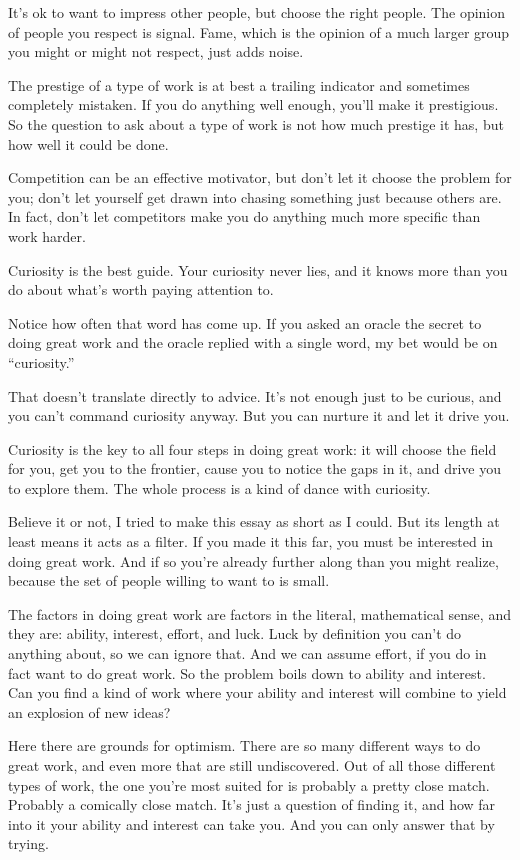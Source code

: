 It's ok to want to impress other people, but choose the right people.
The opinion of people you respect is signal. Fame, which is the opinion
of a much larger group you might or might not respect, just adds noise.

The prestige of a type of work is at best a trailing indicator and
sometimes completely mistaken. If you do anything well enough, you'll
make it prestigious. So the question to ask about a type of work is not
how much prestige it has, but how well it could be done.

Competition can be an effective motivator, but don't let it choose the
problem for you; don't let yourself get drawn into chasing something
just because others are. In fact, don't let competitors make you do
anything much more specific than work harder.

Curiosity is the best guide. Your curiosity never lies, and it knows
more than you do about what's worth paying attention to.

Notice how often that word has come up. If you asked an oracle the
secret to doing great work and the oracle replied with a single word, my
bet would be on ``curiosity.''

That doesn't translate directly to advice. It's not enough just to be
curious, and you can't command curiosity anyway. But you can nurture it
and let it drive you.

Curiosity is the key to all four steps in doing great work: it will
choose the field for you, get you to the frontier, cause you to notice
the gaps in it, and drive you to explore them. The whole process is a
kind of dance with curiosity.

Believe it or not, I tried to make this essay as short as I could. But
its length at least means it acts as a filter. If you made it this far,
you must be interested in doing great work. And if so you're already
further along than you might realize, because the set of people willing
to want to is small.

The factors in doing great work are factors in the literal, mathematical
sense, and they are: ability, interest, effort, and luck. Luck by
definition you can't do anything about, so we can ignore that. And we
can assume effort, if you do in fact want to do great work. So the
problem boils down to ability and interest. Can you find a kind of work
where your ability and interest will combine to yield an explosion of
new ideas?

Here there are grounds for optimism. There are so many different ways to
do great work, and even more that are still undiscovered. Out of all
those different types of work, the one you're most suited for is
probably a pretty close match. Probably a comically close match. It's
just a question of finding it, and how far into it your ability and
interest can take you. And you can only answer that by trying.

